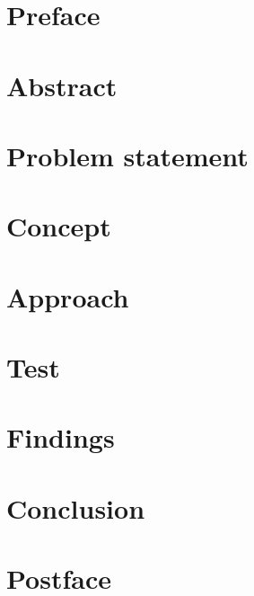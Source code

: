 \documentclass[a4paper,10pt,titlepage,twocolumn]{report}
\begin{document}

\newpage


\newpage
{}

\newcommand{\todo}[1]{\textbf{\textsc{\textcolor{red}{[#1]}}}}

\chapter*{Preface}

\label{preface}

\chapter*{Abstract}

\label{abstract}

\chapter*{Problem statement}
\label{problem}


\chapter*{Concept}
\label{concept}


\chapter*{Approach}
\label{approach}


\chapter*{Test}
\label{test}


\chapter*{Findings}
\label{findings}


\chapter*{Conclusion}
\label{conclusion}


\chapter*{Postface}
\label{postface}


\end{document}
